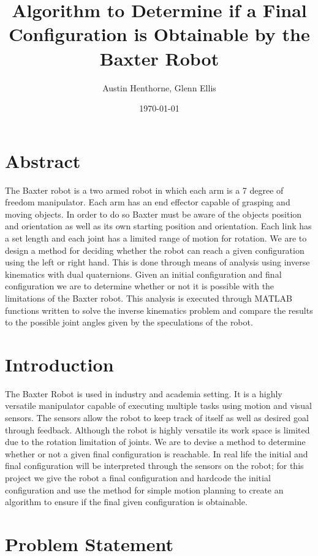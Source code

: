 \documentclass[11pt]{article}
\title{Algorithm to Determine if a Final Configuration is Obtainable by the Baxter Robot }
\author{ Austin Henthorne, Glenn Ellis}
\date{\today}
\begin{document}
\maketitle

\section*{Abstract}
The Baxter robot is a two armed robot in which each arm is a 7 degree of freedom manipulator.
Each arm has an end effector capable of grasping and moving objects. In order to do so Baxter
must be aware of the objects position and orientation as well as its own starting position and
orientation. Each link has a set length and each joint has a limited range of motion for rotation.
We are to design a method for deciding whether the robot can reach a given configuration using
the left or right hand. This is done through means of analysis using inverse kinematics with dual
quaternions. Given an initial configuration and final configuration we are to determine whether
or not it is possible with the limitations of the Baxter robot. This analysis is executed through
MATLAB functions written to solve the inverse kinematics problem and compare the results to the
possible joint angles given by the speculations of the robot.


\section{Introduction}
The Baxter Robot is used in industry and academia setting. It is a highly versatile manipulator capable of executing multiple tasks using motion and visual sensors. The sensors allow the robot to keep track of itself as well as desired goal through feedback. Although the robot is highly versatile its work space is limited due to the rotation limitation of joints. We are to devise a method to determine whether or not a given final configuration is reachable. In real life the initial and final configuration will be interpreted through the sensors on the robot; for this project we give the robot a final configuration and hardcode the initial configuration and use the method for simple motion planning to create an algorithm to ensure if the final given configuration is obtainable.

\section{Problem Statement}
\end{document}
